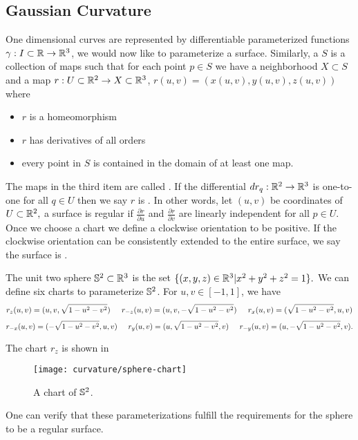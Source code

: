 \subsection{Gaussian Curvature}


One dimensional curves are represented by differentiable 
parameterized functions $\gamma:I\subset \mathbb{R}\to \mathbb{R}^3$,
we would now like to parameterize a surface.
Similarly, a  $S$ is a collection of maps such that
 for each point $p\in S$ we have a neighborhood $X\subset S$
 and a map $r:U\subset \mathbb{R}^2 \to X\subset \mathbb{R}^3$, $r(u,v)=(x(u,v),y(u,v),z(u,v))$
 where
 \begin{itemize}
 \item  $r$ is a homeomorphism
 \item $r$ has derivatives of all orders
 \item every point in $S$ is contained in the domain of at least one map.

\end{itemize}
The maps in the third item are called .
If the differential $dr_q:\mathbb{R}^2\to \mathbb{R}^3$ is one-to-one for all $q\in U$ then
we say $r$ is . In other words, let $(u,v)$ be coordinates of $U\subset \mathbb{R}^2,$
a surface is regular if $\frac{\partial r}{\partial u}$
and $\frac{\partial r}{\partial v}$ are linearly independent for all $p\in U$.
Once we choose a chart we define a clockwise orientation to be positive.
 If the clockwise orientation can be consistently extended to the entire surface, we say
the surface is .


\begin{example}\label{ex:sphere-charts}

The unit two sphere $\mathbb{S}^2\subset \mathbb{R}^3$ is the set $\{(x,y,z)\in \mathbb{R}^3 | x^2+y^2+z^2=1\}.$
We can define six charts to parameterize $\mathbb{S}^2$.
For $u,v\in[-1,1]$, we have
$$r_{z}(u,v)=(u,v,\sqrt{1-u^2-v^2}) \hspace{.5cm}  r_{-z}(u,v)=(u,v,-\sqrt{1-u^2-v^2}) \hspace{.5cm}  r_{x}(u,v)=(\sqrt{1-u^2-v^2},u,v) $$
$$r_{-x}(u,v)=(-\sqrt{1-u^2-v^2},u,v) \hspace{.5cm}  r_{y}(u,v)=(u,\sqrt{1-u^2-v^2},v) \hspace{.5cm}   r_{-y}(u,v)=(u,-\sqrt{1-u^2-v^2},v). $$

The chart $r_{z}$ is shown in 

\begin{figure}[htb]
	\centering
	\texttt{[image: curvature/sphere-chart]}
	\caption{A chart of $\mathbb{S}^2$.}
	\label{fig:sphere-chart}
\end{figure}

One can verify that these parameterizations fulfill the requirements
for the sphere to be a regular surface.

\end{example}


